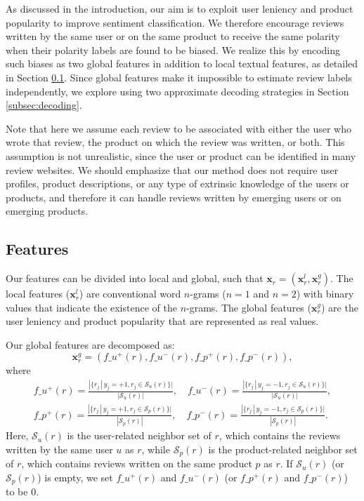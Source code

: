 \documentclass[english]{jnlp_1.4}
\begin{document}
As discussed in the introduction, our aim is to exploit user leniency and product popularity to improve sentiment classification. 
We therefore encourage reviews written by the same user or on the same product to receive the same polarity when their polarity labels are found to be biased.
We realize this by encoding such biases  as two global features in addition to local textual features, as detailed in Section \ref{subsec:features}. 
Since global features make it impossible to estimate review labels independently, we explore using two approximate decoding strategies in Section \ref{subsec:decoding}.

Note that here we assume each review  to be associated with either the user who wrote that review, the product on which the review was written, or both. 
This assumption is not unrealistic, since the user or product can be identified in many review websites.
We should emphasize that our method does not require user profiles, product descriptions, or any type of extrinsic knowledge of the users or products, and therefore it can  handle reviews written by emerging users or on emerging products.


\subsection{Features}
\label{subsec:features}

Our features can be divided into local and global, such that $\boldsymbol{x}_r=(\boldsymbol{x}_r^l, \boldsymbol{x}_r^g)$. 
The local features ($\boldsymbol{x}_r^l$) are  conventional word $n$-grams ($n=1$ and $n=2$) with binary values that indicate the existence of the $n$-grams.
The global features ($\boldsymbol{x}_r^g$) are the user leniency and product popularity that are represented as real values.

Our global features are decomposed as:
\[
\boldsymbol{x}_r^g=(f\_u^+(r),f\_u^-(r),f\_p^+(r),f\_p^-(r)),
\]
where
\begin{gather*}
f\_u^+(r) = \frac{|\{r_j\,|\,y_j=+1, r_j \in \mathcal{S}_u(r)\}|}{|\mathcal{S}_u(r)|},\quad 
	f\_u^-(r)=\frac{|\{r_j\,|\,y_j=-1, r_j \in \mathcal{S}_u(r)\}|}{|\mathcal{S}_u(r)|},\\
f\_p^+(r)=\frac{|\{r_j\,|\,y_j=+1, r_j \in \mathcal{S}_p(r)\}|}{|\mathcal{S}_p(r)|},\quad
	f\_p^-(r)=\frac{|\{r_j\,|\,y_j=-1, r_j \in \mathcal{S}_p(r)\}|}{|\mathcal{S}_p(r)|}.
\end{gather*}
Here, $\mathcal{S}_u(r)$ is the user-related neighbor set of $r$, which contains the reviews written by the  same user $u$ as $r$, while  $\mathcal{S}_p(r)$ is the product-related neighbor set of $r$,  which contains reviews written on the same product $p$ as $r$.
If $\mathcal{S}_u(r)$ (or $\mathcal{S}_p(r)$) is empty, we set $f\_u^+(r)$ and $f\_u^-(r)$ (or $f\_p^+(r)$ and $f\_p^-(r)$) to be $0$.
\end{document}
